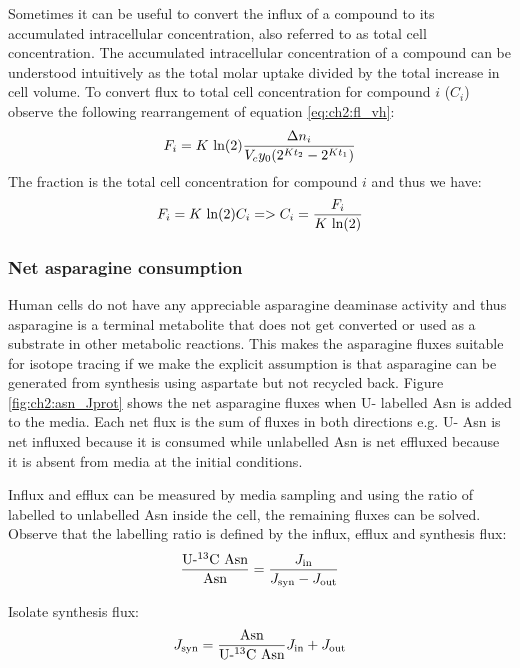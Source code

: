 Sometimes it can be useful to convert the influx of a compound to its accumulated intracellular concentration, also referred to as total cell concentration.
The accumulated intracellular concentration of a compound can be understood intuitively as the total molar uptake divided by the total increase in cell volume.
To convert flux to total cell concentration for compound $i$ ($C_i$) observe the following rearrangement of equation \ref{eq:ch2:fl_vh}:
\begin{equation}
    F_i = K\ \text{ln}(2) \frac{\Delta n_i}{V_c y_0 (2^{K t_2} - 2^{K t_1})}
\end{equation}
The fraction is the total cell concentration for compound $i$ and thus we have:
\begin{equation}
    F_i = K\ \text{ln}(2) C_i => C_i = \frac{F_i}{K\ \text{ln}(2)}
\end{equation}


\subsubsection{Net asparagine consumption}
Human cells do not have any appreciable asparagine deaminase activity \cite{Sullivan2018-gz} and thus asparagine is a terminal metabolite that does not get converted or used as a substrate in other metabolic reactions.
This makes the asparagine fluxes suitable for isotope tracing if we make the explicit assumption is that asparagine can be generated from synthesis using aspartate but not recycled back.
Figure \ref{fig:ch2:asn_Jprot} shows the net asparagine fluxes when U-\hCi{} labelled Asn is added to the media.
Each net flux is the sum of fluxes in both directions e.g. U-\hCi{} Asn is net influxed because it is consumed while unlabelled Asn is net effluxed because it is absent from media at the initial conditions.

Influx and efflux can be measured by media sampling and using the ratio of labelled to unlabelled Asn inside the cell, the remaining fluxes can be solved.
Observe that the labelling ratio is defined by the influx, efflux and synthesis flux:
\begin{equation}
    \frac{\text{U-\textsuperscript{13}C Asn}}{\text{Asn}} = \frac{J_{\text{in}}}{J_{\text{syn}} - J_{\text{out}}}
\end{equation}

Isolate synthesis flux:
\begin{equation}
    J_{\text{syn}} = \frac{\text{Asn}}{\text{U-\textsuperscript{13}C Asn}} J_{\text{in}} + J_{\text{out}}
\label{eq:ch2:Jsyn}
\end{equation}

